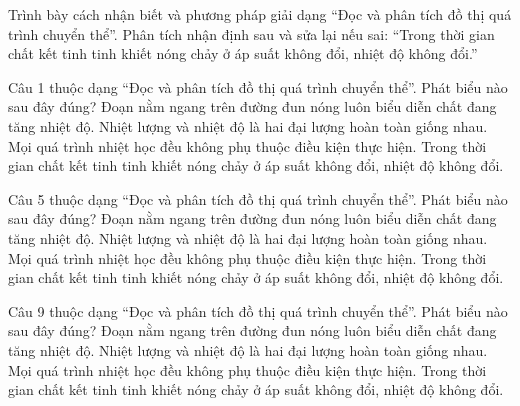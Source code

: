 \begin{bt}
Trình bày cách nhận biết và phương pháp giải dạng “Đọc và phân tích đồ thị quá trình chuyển thể”. Phân tích nhận định sau và sửa lại nếu sai: “Trong thời gian chất kết tinh tinh khiết nóng chảy ở áp suất không đổi, nhiệt độ không đổi.”
\end{bt}

\begin{ex}
Câu 1 thuộc dạng “Đọc và phân tích đồ thị quá trình chuyển thể”. Phát biểu nào sau đây đúng?
\choice
{Đoạn nằm ngang trên đường đun nóng luôn biểu diễn chất đang tăng nhiệt độ.}
{Nhiệt lượng và nhiệt độ là hai đại lượng hoàn toàn giống nhau.}
{Mọi quá trình nhiệt học đều không phụ thuộc điều kiện thực hiện.}
{\True Trong thời gian chất kết tinh tinh khiết nóng chảy ở áp suất không đổi, nhiệt độ không đổi.}
\end{ex}

\begin{ex}
Câu 5 thuộc dạng “Đọc và phân tích đồ thị quá trình chuyển thể”. Phát biểu nào sau đây đúng?
\choice
{Đoạn nằm ngang trên đường đun nóng luôn biểu diễn chất đang tăng nhiệt độ.}
{Nhiệt lượng và nhiệt độ là hai đại lượng hoàn toàn giống nhau.}
{Mọi quá trình nhiệt học đều không phụ thuộc điều kiện thực hiện.}
{\True Trong thời gian chất kết tinh tinh khiết nóng chảy ở áp suất không đổi, nhiệt độ không đổi.}
\end{ex}

\begin{ex}
Câu 9 thuộc dạng “Đọc và phân tích đồ thị quá trình chuyển thể”. Phát biểu nào sau đây đúng?
\choice
{Đoạn nằm ngang trên đường đun nóng luôn biểu diễn chất đang tăng nhiệt độ.}
{Nhiệt lượng và nhiệt độ là hai đại lượng hoàn toàn giống nhau.}
{Mọi quá trình nhiệt học đều không phụ thuộc điều kiện thực hiện.}
{\True Trong thời gian chất kết tinh tinh khiết nóng chảy ở áp suất không đổi, nhiệt độ không đổi.}
\end{ex}

